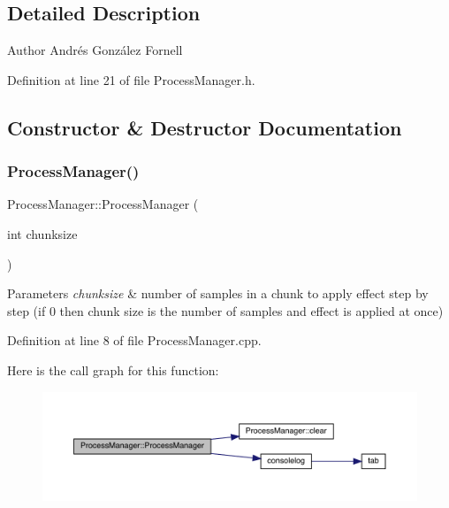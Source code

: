 \subsection{Detailed Description}
\begin{DoxyAuthor}{Author}
Andrés González Fornell 
\end{DoxyAuthor}


Definition at line 21 of file Process\+Manager.\+h.



\subsection{Constructor \& Destructor Documentation}
\mbox{\label{class_process_manager_a875b49ae7a67b7629615747320ff30b7}} 
\subsubsection{\texorpdfstring{Process\+Manager()}{ProcessManager()}}
{\footnotesize\ttfamily Process\+Manager\+::\+Process\+Manager (\begin{DoxyParamCaption}\item[{int}]{chunksize }\end{DoxyParamCaption})}


\begin{DoxyParams}{Parameters}
{\em chunksize} & number of samples in a chunk to apply effect step by step (if 0 then chunk size is the number of samples and effect is applied at once) \\
\hline
\end{DoxyParams}


Definition at line 8 of file Process\+Manager.\+cpp.

Here is the call graph for this function\+:
\nopagebreak
\begin{figure}[H]
\begin{center}
\leavevmode
\includegraphics[width=350pt]{class_process_manager_a875b49ae7a67b7629615747320ff30b7_cgraph}
\end{center}
\end{figure}


